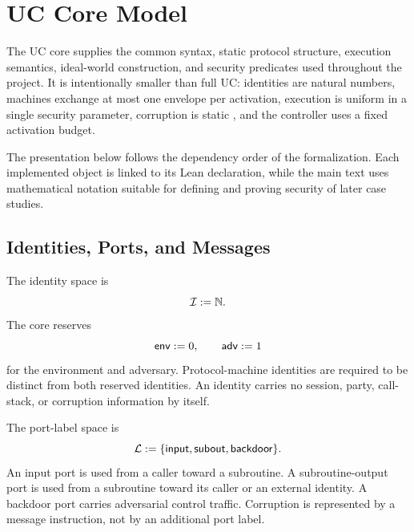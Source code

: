 \section{UC Core Model}

The UC core supplies the common syntax, static protocol structure, execution
semantics, ideal-world construction, and security predicates used throughout
the project.  It is intentionally smaller than full UC: identities are natural
numbers, machines exchange at most one envelope per activation, execution is
uniform in a single security parameter, corruption is static , and the
controller uses a fixed activation budget.

The presentation below follows the dependency order of the formalization.
Each implemented object is linked to its Lean declaration, while the main text
uses mathematical notation suitable for defining and proving security of later
case studies.

\subsection{Identities, Ports, and Messages}

\begin{definition}
\label{def:uc-machine-identities}
\leanok
The identity space is
\[
  \mathcal{I}:=\mathbb{N}.
\]
The core reserves
\[
  \mathsf{env}:=0,
  \qquad
  \mathsf{adv}:=1
\]
for the environment and adversary.  Protocol-machine identities are required
to be distinct from both reserved identities.  An identity carries no session,
party, call-stack, or corruption information by itself.
\end{definition}

\begin{definition}
\label{def:uc-port-labels}
\leanok
The port-label space is
\[
  \mathcal{L}:=
  \{\mathsf{input},\mathsf{subout},\mathsf{backdoor}\}.
\]
An input port is used from a caller toward a subroutine.  A subroutine-output
port is used from a subroutine toward its caller or an external identity.  A
backdoor port carries adversarial control traffic.  Corruption is represented
by a message instruction, not by an additional port label.
\end{definition}

